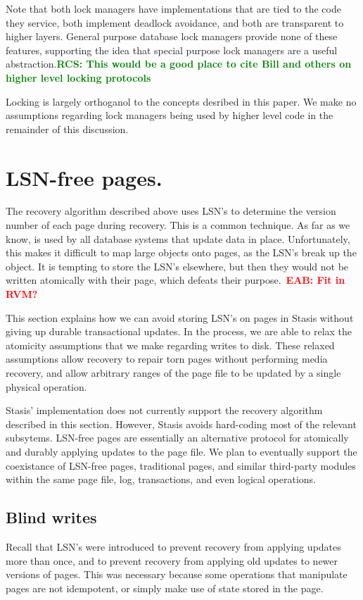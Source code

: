 \documentclass[letterpaper,twocolumn,10pt]{article}
\newcommand{\yad}{Stasis\xspace}
\newcommand{\yads}{Stasis'\xspace}
\newcommand{\eab}[1]{\textcolor{red}{\bf EAB: #1}}
\newcommand{\rcs}[1]{\textcolor{green}{\bf RCS: #1}}
\begin{document}
Note that both lock managers have implementations that are tied to the
code they service, both implement deadlock avoidance, and both are
transparent to higher layers.  General purpose database lock managers
provide none of these features, supporting the idea that special
purpose lock managers are a useful abstraction.\rcs{This would be a
good place to cite Bill and others on higher level locking protocols}

Locking is largely orthoganol to the concepts desribed in this paper.
We make no assumptions regarding lock managers being used by higher
level code in the remainder of this discussion.

\section{LSN-free pages.}
\label{sec:lsn-free}
The recovery algorithm described above uses LSN's to determine the
version number of each page during recovery.  This is a common
technique.  As far as we know, is used by all database systems that
update data in place.  Unfortunately, this makes it difficult to map
large objects onto pages, as the LSN's break up the object.  It
is tempting to store the LSN's elsewhere, but then they would not be
written atomically with their page, which defeats their purpose.~\eab{Fit in RVM?}

This section explains how we can avoid storing LSN's on pages in \yad
without giving up durable transactional updates.  In the process, we
are able to relax the atomicity assumptions that we make regarding
writes to disk.  These relaxed assumptions allow recovery to repair
torn pages without performing media recovery, and allow arbitrary
ranges of the page file to be updated by a single physical operation.

\yads implementation does not currently support the recovery algorithm
described in this section.  However, \yad avoids hard-coding most of
the relevant subsytems.  LSN-free pages are essentially an alternative
protocol for atomically and durably applying updates to the page file.
We plan to eventually support the coexistance of LSN-free pages,
traditional pages, and similar third-party modules within the same
page file, log, transactions, and even logical operations.

\subsection{Blind writes}
Recall that LSN's were introduced to prevent recovery from applying
updates more than once, and to prevent recovery from applying old
updates to newer versions of pages.  This was necessary because some
operations that manipulate pages are not idempotent, or simply make
use of state stored in the page.  
\end{document}
